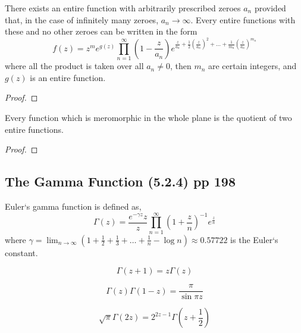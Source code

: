 \begin{theorem}[Weierstrass]
	There exists an entire function with arbitrarily prescribed zeroes $a_n$ provided that, in the case of infinitely many zeroes, $a_n \to \infty$. Every entire functions with these and no other zeroes can be written in the form
	\begin{equation}
		f(z) = z^m e^{g(z)} \prod_{n=1}^\infty \left( 1- \frac{z}{a_n} \right) e^{\frac{z}{a_n} + \frac{1}{2}(\frac{z}{a_n})^2 + \dots + \frac{1}{m_n}(\frac{z}{a_n})^{m_n}}
	\end{equation}
	where all the product is taken over all $a_n \ne 0$, then $m_n$ are certain integers, and $g(z)$ is an entire function.
\end{theorem}
\begin{proof}
\end{proof}

\begin{corollary}
	Every function which is meromorphic in the whole plane is the quotient of two entire functions.
\end{corollary}
\begin{proof}
\end{proof}

\subsection{The Gamma Function (5.2.4) pp 198}
\begin{definition}
	Euler`s gamma function is defined as,
\begin{equation}
	\Gamma(z) = \frac{e^{-\gamma z}{z}}{z} \prod_{n=1}^\infty \left( 1+\frac{z}{n}\right)^{-1} e^\frac{z}{n}
\end{equation}
	where $\gamma = \displaystyle \lim_{n \to \infty} \left( 1+ \frac{1}{2} + \frac{1}{3} + \dots + \frac{1}{n} - \log n \right) \approx 0.57722 $ is the Euler`s constant.
\end{definition}
\begin{remark}
	\begin{equation}
		\Gamma(z+1) = z \Gamma(z)
	\end{equation}
\end{remark}
\begin{remark}
	\begin{equation}
		\Gamma(z) \Gamma(1-z) = \frac{\pi}{\sin \pi z}
	\end{equation}
\end{remark}
\begin{remark}
	\begin{equation}
		\sqrt{\pi} \Gamma(2z) = 2^{2z-1} \Gamma\left(z+\frac{1}{2}\right)
	\end{equation}
\end{remark}
